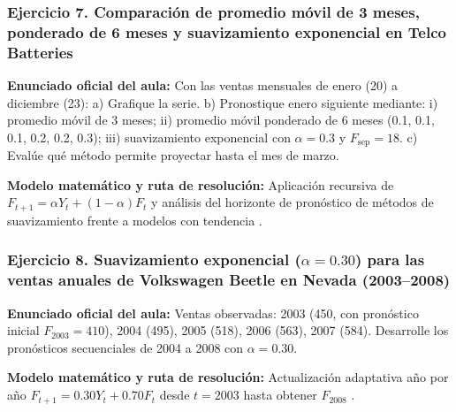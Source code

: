 {\subsubsection*{Ejercicio 7. Comparación de promedio móvil de 3 meses, ponderado de 6 meses y suavizamiento exponencial en Telco Batteries}
\textbf{Enunciado oficial del aula:} Con las ventas mensuales de enero (20) a diciembre (23): a) Grafique la serie. b) Pronostique enero siguiente mediante: i) promedio móvil de 3 meses; ii) promedio móvil ponderado de 6 meses (0.1, 0.1, 0.1, 0.2, 0.2, 0.3); iii) suavizamiento exponencial con $\alpha = 0.3$ y $F_{\text{sep}} = 18$. c) Evalúe qué método permite proyectar hasta el mes de marzo.

\textbf{Modelo matemático y ruta de resolución:} Aplicación recursiva de $F_{t+1} = \alpha Y_t + (1-\alpha)F_t$ y análisis del horizonte de pronóstico de métodos de suavizamiento frente a modelos con tendencia \citep{hyndmanForecasting2021,anderson2012}.

\subsubsection*{Ejercicio 8. Suavizamiento exponencial ($\alpha = 0.30$) para las ventas anuales de Volkswagen Beetle en Nevada (2003--2008)}
\textbf{Enunciado oficial del aula:} Ventas observadas: 2003 (450, con pronóstico inicial $F_{2003}=410$), 2004 (495), 2005 (518), 2006 (563), 2007 (584). Desarrolle los pronósticos secuenciales de 2004 a 2008 con $\alpha = 0.30$.

\textbf{Modelo matemático y ruta de resolución:} Actualización adaptativa año por año $F_{t+1} = 0.30 Y_t + 0.70 F_t$ desde $t=2003$ hasta obtener $F_{2008}$ \citep{anderson2012}.


}
